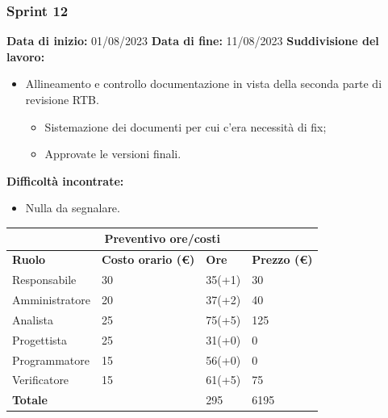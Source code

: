 \documentclass[a4paper, 12pt]{article}
\begin{document}
\subsubsection{Sprint 12}
\textbf{Data di inizio:} 01/08/2023\newline
\textbf{Data di fine:} 11/08/2023\newline
\newline
\textbf{Suddivisione del lavoro:}
\begin{itemize}
    \item Allineamento e controllo documentazione in vista della seconda parte di revisione RTB.
    \begin{itemize}
        \item Sistemazione dei documenti per cui c'era necessità di fix;
        \item Approvate le versioni finali.
    \end{itemize}
\end{itemize}
\textbf{Difficoltà incontrate:}
\begin{itemize}
    \item Nulla da segnalare.
\end{itemize}
\begin{center}
	\begin{tabularx}{\textwidth}{|X|X|X|X|}
		\hline
		\multicolumn{4}{|c|}{\textbf{Preventivo ore/costi}}                                      \\
		\hline
		\hline
		\textbf{Ruolo}  & \textbf{Costo orario (\euro)} & \textbf{Ore} & \textbf{Prezzo (\euro)} \\
		\hline
		Responsabile    & 30                            & 35(+1)       & 30                     \\
		\hline
		Amministratore  & 20                            & 37(+2)       & 40                      \\
		\hline
		Analista        & 25                            & 75(+5)       & 125                       \\
		\hline
		Progettista     & 25                            & 31(+0)       & 0                      \\
		\hline
		Programmatore   & 15                            & 56(+0)       & 0                      \\
		\hline
		Verificatore    & 15                            & 61(+5)       & 75                      \\
		\hline
		\hline
		\textbf{Totale} &                               & 295          & 6195                    \\
		\hline
	\end{tabularx}\\[8pt]
	\mbox{}\\
\end{center}
\end{document}
